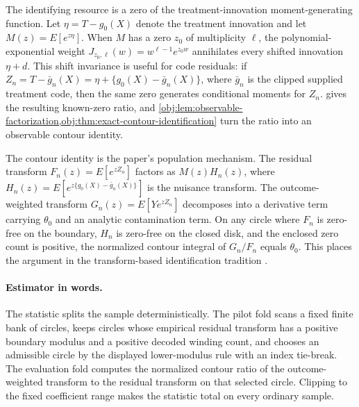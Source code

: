 The identifying resource is a zero of the treatment-innovation moment-generating function. Let \(\eta=T-g_0(X)\) denote the treatment innovation and let \(M(z)=E[e^{z\eta}]\). When \(M\) has a zero \(z_0\) of multiplicity \(\ell\), the polynomial-exponential weight \(J_{z_0,\ell}(w)=w^{\ell-1}e^{z_0w}\) annihilates every shifted innovation \(\eta+d\). This shift invariance is useful for code residuals: if \(Z_n=T-\bar g_n(X)=\eta+\{g_0(X)-\bar g_n(X)\}\), where \(\bar g_n\) is the clipped supplied treatment code, then the same zero generates conditional moments for \(Z_n\).  gives the resulting known-zero ratio, and \cref{obj:lem:observable-factorization,obj:thm:exact-contour-identification} turn the ratio into an observable contour identity.

The contour identity is the paper's population mechanism. The residual transform \(F_n(z)=E[e^{zZ_n}]\) factors as \(M(z)H_n(z)\), where \(H_n(z)=E[e^{z\{g_0(X)-\bar g_n(X)\}}]\) is the nuisance transform. The outcome-weighted transform \(G_n(z)=E[Ye^{zZ_n}]\) decomposes into a derivative term carrying \(\theta_0\) and an analytic contamination term. On any circle where \(F_n\) is zero-free on the boundary, \(H_n\) is zero-free on the closed disk, and the enclosed zero count is positive, the normalized contour integral of \(G_n/F_n\) equals \(\theta_0\). This places the argument in the transform-based identification tradition \citep{FeuervergerMcDunnough1981,Singleton2001,ChackoViceira2003,CarrascoFlorensRenault2007,Carrasco2017,KaganLinnikRao1973,Mattner1992,DHaultfoeuille2011,DarollesFanFlorensRenault2011,HuShiu2022}.

\paragraph{Estimator in words.}
The statistic splits the sample deterministically. The pilot fold scans a fixed finite bank of circles, keeps circles whose empirical residual transform has a positive boundary modulus and a positive decoded winding count, and chooses an admissible circle by the displayed lower-modulus rule with an index tie-break. The evaluation fold computes the normalized contour ratio of the outcome-weighted transform to the residual transform on that selected circle. Clipping to the fixed coefficient range makes the statistic total on every ordinary sample.

